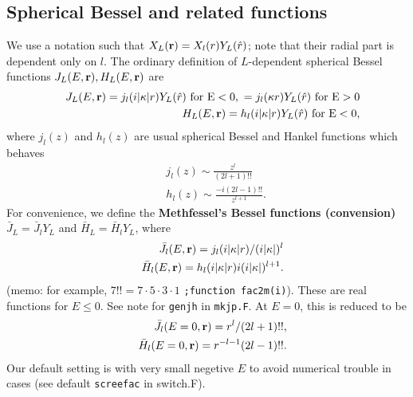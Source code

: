 \documentclass[a4paper,10pt,epsf,fleqn]{article}
\newcommand{\bfr}{{\bf r}}
\begin{document}
\subsection{Spherical Bessel and related functions}
We use a notation such that $X_L(\bfr)=X_l(r) Y_L(\hat{r})$; note that
their radial part is dependent only on $l$.
The ordinary definition of $L$-dependent spherical Bessel functions
$J_L(E,\bfr),H_L(E,\bfr)$ are
\begin{eqnarray}
&&{J}_L(E,\bfr)=j_l(i|\kappa| r)Y_L(\hat{r}) 
\ {\rm for \ E<0},\ = j_l(\kappa r)Y_L(\hat{r})
\ {\rm for \ E>0}
\nonumber \\
&&{H}_L(E,\bfr)=h_l(i|\kappa| r)Y_L(\hat{r})
\ {\rm for \ E<0}, 
\label{eq:OrdinaryBessel}
\end{eqnarray}
where $j_l(z)$ and $h_l(z)$ are usual spherical Bessel and Hankel functions
which behaves 
\begin{eqnarray}
&&j_l(z) \sim \frac{z^l}{(2l+1)!!} \nonumber \\
&&h_l(z) \sim \frac{-i(2l-1)!!}{z^{l+1}}.
\end{eqnarray}
For convenience, we define 
the {\bf Methfessel's Bessel functions (convension)} 
$\bar{J}_L=\bar{J}_lY_L$ and $\bar{H}_L=\bar{H}_lY_L$, where 
\begin{eqnarray}
&&\bar{J}_l(E,\bfr)=j_l(i|\kappa| r) / (i |\kappa|)^l \nonumber \\
&&\bar{H}_l(E,\bfr)=h_l(i|\kappa| r) i (i |\kappa|)^{l+1}. 
\label{eq:Mbessel}
\end{eqnarray}
(memo: for example, $7!!=7\cdot5\cdot3\cdot1$ \verb!;function fac2m(i)!).
These are real functions for $E\le 0$.
See note for \verb!genjh! in \verb!mkjp.F!.
At $E=0$, this is reduced to be 
\begin{eqnarray}
&&\bar{J}_l(E=0,\bfr)=r^l/(2l+1)!!, \\
&&\bar{H}_l(E=0,\bfr)=r^{-l-1} (2l-1)!!.
\end{eqnarray}
Our default setting is with very small negetive $E$ to avoid numerical 
trouble in cases (see default \verb#screefac# in switch.F).
\end{document}
